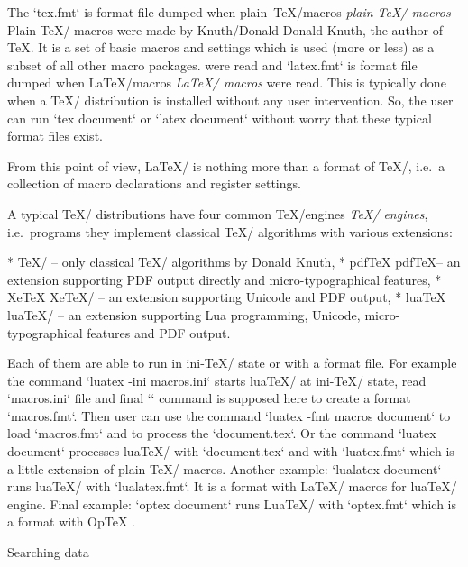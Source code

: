 The `tex.fmt` is format file dumped when \ii plain~TeX/macros {\em plain \TeX/ macros}\fnote
{Plain \TeX/ macros were made by \ii Knuth/Donald Donald Knuth, the author of \TeX. It is a
set of basic macros and settings which is used (more or less) as a subset of
all other macro packages.} 
were read and `latex.fmt` is format file dumped when \ii LaTeX/macros {\em \LaTeX/ macros} were read.
This is typically done when a \TeX/ distribution is installed without any user
intervention. So, the user can run `tex document` or `latex document` without
worry that these typical format files exist.

From this point of view, \LaTeX/ is nothing more than a format of \TeX/,
i.e.~a collection of macro declarations and register settings.

A typical \TeX/ distributions have four common \ii TeX/engines {\em \TeX/ engines}, i.e.~programs
they implement classical \TeX/ algorithms with various extensions: 

\begitems
* \TeX/ -- only classical \TeX/ algorithms by Donald Knuth, 
* \ii pdfTeX pdf\TeX -- an extension supporting PDF output directly and
             micro-typographical features,
* \ii XeTeX Xe\TeX/ -- an extension supporting Unicode and PDF output, 
* \ii luaTeX lua\TeX/ -- an extension supporting Lua programming, Unicode,
            micro-typographical features and PDF output.
\enditems

Each of them are able to run in ini-\TeX/ state or with a format file. For
example the command `luatex -ini macros.ini` starts lua\TeX/ at ini-\TeX/ state,
read `macros.ini` file and final `\dump` command is supposed here to create
a format `macros.fmt`. Then user can use the command `luatex -fmt macros document` to
load `macros.fmt` and to process the `document.tex`.
Or the command `luatex document` processes lua\TeX/ with `document.tex` and 
with `luatex.fmt` which is a little extension of plain \TeX/ macros. Another example:
`lualatex document` runs lua\TeX/ with `lualatex.fmt`. It is a format with
\LaTeX/ macros for lua\TeX/ engine. Final example: 
`optex document` runs Lua\TeX/ with `optex.fmt` which is
a format with \ii OpTeX .

\sec Searching data

